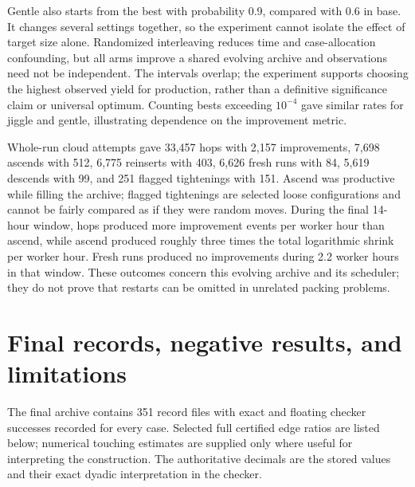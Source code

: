 \documentclass[11pt,a4paper]{article}
\begin{document}
Gentle also starts from the best with probability 0.9, compared with 0.6 in base. It changes several settings together, so the experiment cannot isolate the effect of target size alone. Randomized interleaving reduces time and case-allocation confounding, but all arms improve a shared evolving archive and observations need not be independent. The intervals overlap; the experiment supports choosing the highest observed yield for production, rather than a definitive significance claim or universal optimum. Counting bests exceeding \(10^{-4}\) gave similar rates for jiggle and gentle, illustrating dependence on the improvement metric.

Whole-run cloud attempts gave 33,457 hops with 2,157 improvements, 7,698 ascends with 512, 6,775 reinserts with 403, 6,626 fresh runs with 84, 5,619 descends with 99, and 251 flagged tightenings with 151. Ascend was productive while filling the archive; flagged tightenings are selected loose configurations and cannot be fairly compared as if they were random moves. During the final 14-hour window, hops produced more improvement events per worker hour than ascend, while ascend produced roughly three times the total logarithmic shrink per worker hour. Fresh runs produced no improvements during 2.2 worker hours in that window. These outcomes concern this evolving archive and its scheduler; they do not prove that restarts can be omitted in unrelated packing problems.

\section{Final records, negative results, and limitations}

The final archive contains 351 record files with exact and floating checker successes recorded for every case. Selected full certified edge ratios are listed below; numerical touching estimates are supplied only where useful for interpreting the construction. The authoritative decimals are the stored values and their exact dyadic interpretation in the checker.
\end{document}
